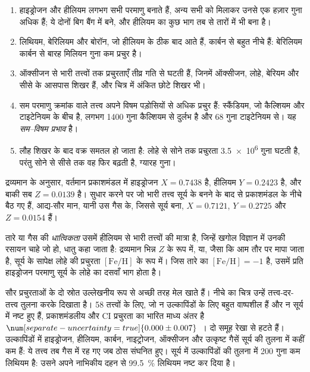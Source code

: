 \begin{enumerate}
\item हाइड्रोजन और हीलियम लगभग सभी परमाणु बनाते हैं,
  अन्य सभी को मिलाकर उनसे एक हज़ार गुना अधिक हैं; ये दोनों बिग बैंग में बने,
  और हीलियम का कुछ भाग तब से तारों में भी बना है।
\item लिथियम, बेरिलियम और बोरॉन, जो हीलियम के ठीक बाद आते हैं, कार्बन से बहुत नीचे हैं:
  बेरिलियम कार्बन से बारह मिलियन गुना कम प्रचुर है।
\item ऑक्सीजन से भारी तत्त्वों तक प्रचुरताएँ तीव्र गति से घटती हैं, जिनमें
  ऑक्सीजन, लोहे, बेरियम और सीसे के आसपास शिखर हैं,
  और चित्र में अंकित छोटे शिखर भी।
\item सम परमाणु क्रमांक वाले तत्त्व अपने विषम पड़ोसियों से अधिक प्रचुर हैं:
  स्कैंडियम, जो कैल्शियम और टाइटेनियम के बीच है, लगभग \num{1400}
  गुना कैल्शियम से दुर्लभ है और \num{68} गुना टाइटेनियम से। यह
  \emph{सम--विषम प्रभाव} है।
\item लौह शिखर के बाद वक्र समतल हो जाता है: लोहे से सोने तक
  प्रचुरता \num{3.5e6} गुना घटती है, परंतु सोने से सीसे तक वह
  फिर बढ़ती है, ग्यारह गुना।
\end{enumerate}

द्रव्यमान के अनुसार, वर्तमान प्रकाशमंडल में हाइड्रोजन $X = 0.7438$ है,
हीलियम $Y = 0.2423$ है, और बाकी सब $Z = 0.0139$ है। सुधार करने पर
जो भारी तत्त्व सूर्य के बनने के बाद से प्रकाशमंडल के नीचे बैठ गए हैं,
आद्य-सौर मान, यानी उस गैस के, जिससे सूर्य बना,
$X = 0.7121$, $Y = 0.2725$ और $Z = 0.0154$ हैं।

\begin{definition}[धात्विकता]\label{def:b3:origin-of-elements:metallicity}
तारे या गैस की \emph{धात्विकता} उसमें हीलियम से भारी तत्त्वों की
मात्रा है, जिन्हें खगोल विज्ञान में उनकी रसायन चाहे जो हो, धातु कहा जाता है:
द्रव्यमान भिन्न $Z$ के रूप में, या, जैसा कि आम तौर पर मापा जाता है,
सूर्य के सापेक्ष लोहे की प्रचुरता $[\mathrm{Fe/H}]$ के रूप में।
जिस तारे का $[\mathrm{Fe/H}] = -1$ है, उसमें प्रति हाइड्रोजन परमाणु
सूर्य के लोहे का दसवाँ भाग होता है।
\end{definition}

सौर प्रचुरताओं के दो स्रोत उल्लेखनीय रूप से अच्छी तरह मेल खाते हैं। नीचे का चित्र
उन्हें तत्त्व-दर-तत्त्व तुलना करके दिखाता है। 58 तत्त्वों के लिए, जो न
उल्कापिंडों के लिए बहुत वाष्पशील हैं और न सूर्य में नष्ट हुए हैं,
प्रकाशमंडलीय और CI प्रचुरता का भारित माध्य अंतर
है $\num[separate-uncertainty=true]{0.000 \pm 0.007}$~। दो समूह
रेखा से हटते हैं। उल्कापिंडों में हाइड्रोजन, हीलियम,
कार्बन, नाइट्रोजन, ऑक्सीजन और उत्कृष्ट गैसें सूर्य की तुलना में कहीं कम हैं:
ये तत्त्व तब गैस में रह गए जब ठोस संघनित हुए। सूर्य में
उल्कापिंडों की तुलना में \num{200} गुना कम लिथियम है: उसने
अपने नाभिकीय दहन से \qty{99.5}{\percent} लिथियम नष्ट कर दिया है।

